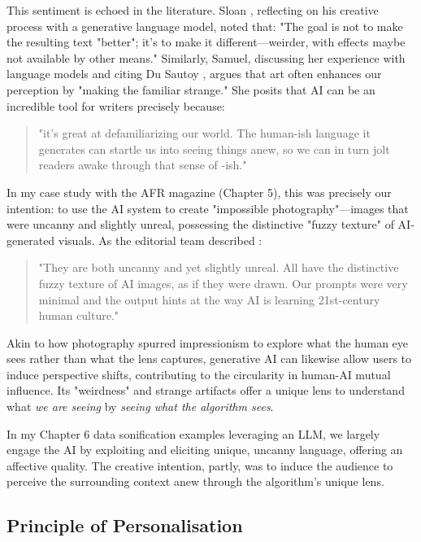 This sentiment is echoed in the literature. Sloan \cite{Sloan2016-fj}, reflecting on his creative process with a generative language model, noted that: "The goal is not to make the resulting text "better"; it's to make it different—weirder, with effects maybe not available by other means." Similarly, Samuel, discussing her experience with language models and citing Du Sautoy \cite{Samuel2019-gc}, argues that art often enhances our perception by "making the familiar strange." She posits that AI can be an incredible tool for writers precisely because:

\begin{quote}
"it's great at defamiliarizing our world. The human-ish language it generates can startle us into seeing things anew, so we can in turn jolt readers awake through that sense of -ish."
\end{quote}

In my case study with the AFR magazine (Chapter 5), this was precisely our intention: to use the AI system to create "impossible photography"—images that were uncanny and slightly unreal, possessing the distinctive "fuzzy texture" of AI-generated visuals. As the editorial team described \cite{Drummond2023-av}:

\begin{quote}
"They are both uncanny and yet slightly unreal. All have the distinctive fuzzy texture of AI images, as if they were drawn. Our prompts were very minimal and the output hints at the way AI is learning 21st-century human culture."
\end{quote}

Akin to how photography spurred impressionism to explore what the human eye sees rather than what the lens captures, generative AI can likewise allow users to induce perspective shifts, contributing to the circularity in human-AI mutual influence. Its "weirdness" and strange artifacts offer a unique lens to understand what \textit{we are seeing} by \textit{seeing what the algorithm sees}. 

In my Chapter 6 data sonification examples leveraging an LLM, we largely engage the AI by exploiting and eliciting unique, uncanny language, offering an affective quality. The creative intention, partly, was to induce the audience to perceive the surrounding context anew through the algorithm's unique lens.

\subsection{Principle of Personalisation}

